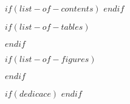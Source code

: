

\frontmatter                    %

\frontispice                    %


$if(list-of-contents)$
\tableofcontents           
\cleardoublepage
$endif$

$if(list-of-tables)$
 \listoftables                 
 \cleardoublepage
$endif$

$if(list-of-figures)$
  \listoffigures
  \cleardoublepage
$endif$

$if(dedicace)$
 \cleardoublepage
$endif$


\mainmatter                     %
